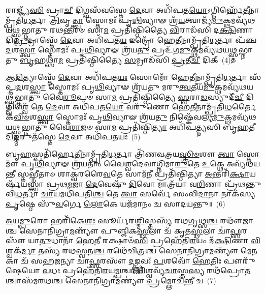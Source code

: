 𑌰𑌾𑌜𑍍𑌞𑍍𑌯᳴\-\ul{𑌸𑌿} 𑌪𑍍𑌰𑌾\-\ul{𑌚𑍀} 𑌦𑌿𑌗𑍍𑌵𑌸᳴𑌵𑌸𑍍𑌤𑍇 \ul{𑌦𑍇}\-𑌵𑌾 𑌅𑌧𑌿᳴𑌪𑌤\-\ul{𑌯𑍋}\-\-𑌽𑌗𑍍𑌨𑌿𑌰𑍍\mbox{}𑌹𑍇᳴\-\ul{𑌤𑍀}\-𑌨𑌾𑌮𑍍𑌪𑍍𑌰᳴𑌤𑌿\-\ul{𑌧}\-𑌰𑍍𑌤𑌾 \ul{𑌤𑍍𑌰𑌿}\-𑌵𑍃\-\ul{𑌤𑍍𑌤𑍍𑌵𑌾} 𑌸𑍍𑌤𑍋𑌮𑌃᳴ 𑌪𑍃\-\ul{𑌥𑌿}\-𑌵𑍍𑌯𑌾𑍟 𑌶𑍍𑌰᳴\-\ul{𑌯}\-𑌤𑍍𑌵𑌾𑌜𑍍𑌯᳴\-\ul{𑌮𑍁}\-𑌕𑍍𑌥\-𑌮𑌵𑍍𑌯᳴𑌥𑌯𑌥𑍍𑌸𑍍𑌤𑌭𑍍𑌨𑌾𑌤𑍁 𑌰𑌥\-\ul{𑌨𑍍𑌤}\-𑌰𑍞 𑌸𑌾\-\ul{𑌮} 𑌪𑍍𑌰𑌤𑌿᳴𑌷𑍍𑌠𑌿𑌤𑍍𑌯𑍈 \ul{𑌵𑌿}\-𑌰𑌾𑌡᳴𑌸𑌿 𑌦\-\ul{𑌕𑍍𑌷𑌿}\-𑌣𑌾 𑌦𑌿\-\ul{𑌗𑍍𑌰𑍁}\-𑌦𑍍𑌰𑌾𑌸𑍍𑌤𑍇᳴ \ul{𑌦𑍇}\-𑌵𑌾 𑌅𑌧𑌿᳴𑌪𑌤\-\ul{𑌯} 𑌇𑌨𑍍𑌦𑍍𑌰𑍋᳴ 𑌹𑍇\-\ul{𑌤𑍀}\-𑌨𑌾𑌮𑍍𑌪𑍍𑌰᳴𑌤𑌿\-\ul{𑌧}\-𑌰𑍍𑌤𑌾 𑌪᳴𑌞𑍍𑌚\-\ul{𑌦}\-𑌶\-\ul{𑌸𑍍𑌤𑍍𑌵𑌾} 𑌸𑍍𑌤𑍋𑌮𑌃᳴ 𑌪𑍃\-\ul{𑌥𑌿}\-𑌵𑍍𑌯𑌾𑍟 𑌶𑍍𑌰᳴𑌯\-\ul{𑌤𑍁} 𑌪𑍍𑌰𑌉᳴𑌗\-\ul{𑌮𑍁}\-𑌕𑍍𑌥𑌮𑌵𑍍𑌯᳴𑌥𑌯𑌥𑍍𑌸𑍍𑌤𑌭𑍍𑌨𑌾𑌤𑍁 \ul{𑌬𑍃}\-𑌹𑌥𑍍𑌸𑌾\-\ul{𑌮} 𑌪𑍍𑌰𑌤𑌿᳴𑌷𑍍𑌠𑌿𑌤𑍍𑌯𑍈 \ul{𑌸}\-𑌮𑍍𑌰𑌾𑌡᳴𑌸𑌿 \ul{𑌪𑍍𑌰}\-𑌤𑍀\-\ul{𑌚𑍀} 𑌦𑌿𑌕𑍍~(4)

\-\ul{𑌆}\-\-\ul{𑌦𑌿}\-𑌤𑍍𑌯𑌾𑌸𑍍𑌤𑍇᳴ \ul{𑌦𑍇}\-𑌵𑌾 𑌅𑌧𑌿᳴𑌪𑌤\-\ul{𑌯𑌃} 𑌸𑍋𑌮𑍋᳴ 𑌹𑍇\-\ul{𑌤𑍀}\-𑌨𑌾𑌮𑍍𑌪𑍍𑌰᳴𑌤𑌿\-\ul{𑌧}\-𑌰𑍍𑌤𑌾 𑌸᳴𑌪𑍍𑌤\-\ul{𑌦}\-𑌶\-\ul{𑌸𑍍𑌤𑍍𑌵𑌾} 𑌸𑍍𑌤𑍋𑌮𑌃᳴ 𑌪𑍃\-\ul{𑌥𑌿}\-𑌵𑍍𑌯𑌾𑍟 𑌶𑍍𑌰᳴𑌯𑌤𑍁 𑌮𑌰𑍁\-\ul{𑌤𑍍𑌵}\-𑌤𑍀𑌯᳴\-\ul{𑌮𑍁}\-𑌕𑍍𑌥\-𑌮𑌵𑍍𑌯᳴𑌥𑌯𑌥𑍍𑌸𑍍𑌤𑌭𑍍𑌨𑌾𑌤𑍁 𑌵𑍈\-\ul{𑌰𑍂}\-𑌪𑍞 𑌸𑌾\-\ul{𑌮} 𑌪𑍍𑌰𑌤𑌿᳴𑌷𑍍𑌠𑌿𑌤𑍍𑌯𑍈 \ul{𑌸𑍍𑌵}\-𑌰𑌾\-\ul{𑌡}\-𑌸𑍍𑌯𑍁𑌦𑍀᳴\-\ul{𑌚𑍀} 𑌦𑌿𑌗𑍍𑌵𑌿𑌶𑍍𑌵𑍇᳴ 𑌤𑍇 \ul{𑌦𑍇}\-𑌵𑌾 𑌅𑌧𑌿᳴𑌪𑌤\-\ul{𑌯𑍋} 𑌵𑌰𑍁᳴𑌣𑍋 𑌹𑍇\-\ul{𑌤𑍀}\-𑌨𑌾𑌮𑍍𑌪𑍍𑌰᳴𑌤𑌿\-\ul{𑌧}\-𑌰𑍍𑌤𑍈𑌕᳴\-\-\ul{𑌵𑌿}\-\-\ul{𑍞}\-𑌶\-\ul{𑌸𑍍𑌤𑍍𑌵𑌾} 𑌸𑍍𑌤𑍋𑌮𑌃᳴ 𑌪𑍃\-\ul{𑌥𑌿}\-𑌵𑍍𑌯𑌾𑍟 𑌶𑍍𑌰᳴𑌯\-\ul{𑌤𑍁} 𑌨𑌿𑌷𑍍𑌕𑍇᳴𑌵𑌲𑍍𑌯\-\ul{𑌮𑍁}\-𑌕𑍍𑌥𑌮𑌵𑍍𑌯᳴𑌥𑌯𑌥𑍍𑌸𑍍𑌤𑌭𑍍𑌨𑌾𑌤𑍁 𑌵𑍈\-\ul{𑌰𑌾}\-𑌜𑍞 𑌸𑌾\-\ul{𑌮} 𑌪𑍍𑌰𑌤𑌿᳴𑌷𑍍𑌠𑌿\-\ul{𑌤𑍍𑌯𑌾} 𑌅𑌧𑌿᳴𑌪𑌤𑍍𑌨𑍍𑌯𑌸𑌿 𑌬𑍃\-\ul{𑌹}\-𑌤𑍀 𑌦𑌿\-\ul{𑌙𑍍𑌮}\-𑌰𑍁𑌤᳴𑌸𑍍𑌤𑍇 \ul{𑌦𑍇}\-𑌵𑌾 𑌅𑌧𑌿᳴𑌪𑌤𑌯𑌃~(5)

𑌬𑍃\-\ul{𑌹}\-𑌸𑍍𑌪𑌤𑌿᳴𑌰𑍍\mbox{}𑌹𑍇\-\ul{𑌤𑍀}\-𑌨𑌾𑌮𑍍𑌪𑍍𑌰᳴𑌤𑌿\-\ul{𑌧}\-𑌰𑍍𑌤𑌾 𑌤𑍍𑌰𑌿᳴𑌣𑌵𑌤𑍍𑌰𑌯\-\ul{𑌸𑍍𑌤𑍍𑌰𑌿}\-\-\ul{𑍞}\-𑌶𑍗 \ul{𑌤𑍍𑌵𑌾} 𑌸𑍍𑌤𑍋𑌮𑍗᳴ 𑌪𑍃\-\ul{𑌥𑌿}\-𑌵𑍍𑌯𑌾𑍟 𑌶𑍍𑌰᳴𑌯𑌤𑌾𑌂 𑌵𑍈𑌶𑍍𑌵𑌦𑍇𑌵𑌾𑌗𑍍𑌨𑌿𑌮𑌾\-\ul{𑌰𑍁}\-𑌤𑍇 \ul{𑌉}\-𑌕𑍍𑌥𑍇 𑌅𑌵𑍍𑌯᳴𑌥𑌯𑌨𑍍𑌤𑍀 𑌸𑍍𑌤𑌭𑍍𑌨𑍀𑌤𑌾𑍞 𑌶𑌾𑌕𑍍𑌵𑌰𑌰𑍈\-\ul{𑌵}\-𑌤𑍇 𑌸𑌾𑌮᳴\-\ul{𑌨𑍀} 𑌪𑍍𑌰𑌤𑌿᳴𑌷𑍍𑌠𑌿𑌤𑍍𑌯𑌾 \ul{𑌅}\-𑌨𑍍𑌤𑌰𑌿᳴\-\ul{𑌕𑍍𑌷𑌾}\-𑌯𑌰𑍍\mbox{}𑌷᳴𑌯𑌸𑍍𑌤𑍍𑌵𑌾 𑌪𑍍𑌰𑌥\-\ul{𑌮}\-𑌜𑌾 \ul{𑌦𑍇}\-𑌵𑍇𑌷𑍁᳴ \ul{𑌦𑌿}\-𑌵𑍋 𑌮𑌾𑌤𑍍𑌰᳴𑌯𑌾 𑌵\-\ul{𑌰𑌿}\-𑌣𑌾 𑌪𑍍𑌰᳴𑌥𑌨𑍍𑌤𑍁 𑌵𑌿\-\ul{𑌧}\-𑌰𑍍𑌤𑌾 \ul{𑌚𑌾}\-𑌯𑌮𑌧𑌿᳴𑌪𑌤𑌿\-\ul{𑌶𑍍𑌚} 𑌤𑍇 \ul{𑌤𑍍𑌵𑌾} 𑌸𑌰𑍍𑌵𑍇᳴ 𑌸𑌂𑌵𑌿\-\ul{𑌦𑌾}\-𑌨𑌾 𑌨𑌾𑌕᳴𑌸𑍍𑌯 \ul{𑌪𑍃}\-𑌷𑍍𑌠𑍇 𑌸𑍁᳴\-\ul{𑌵}\-𑌰𑍍𑌗𑍇 \ul{𑌲𑍋}\-𑌕𑍇 𑌯𑌜᳴𑌮𑌾𑌨𑌂 𑌚 𑌸𑌾𑌦𑌯𑌨𑍍𑌤𑍁॥~(6)

{\anuvakamend[{\-\ul{𑌪𑍍𑌰}\-𑌤𑍀\-\ul{𑌚𑍀} 𑌦𑌿\-\ul{𑌙𑍍𑌮}\-𑌰𑍁𑌤᳴𑌸𑍍𑌤𑍇 \ul{𑌦𑍇}\-𑌵𑌾 𑌅𑌧𑌿᳴𑌪𑌤𑌯𑌶𑍍𑌚𑌤𑍍𑌵𑌾\-\ul{𑌰𑌿}\-\-\ul{𑍞}\-𑌶𑌚𑍍𑌚᳴}]}%

\-\ul{𑌅}\-𑌯\-\ul{𑌮𑍍𑌪𑍁}\-𑌰𑍋 𑌹𑌰𑌿᳴𑌕𑍇\-\ul{𑌶𑌃} 𑌸𑍂𑌰𑍍𑌯᳴𑌰\-\ul{𑌶𑍍𑌮𑌿}\-𑌸𑍍𑌤𑌸𑍍𑌯᳴ 𑌰𑌥\-\ul{𑌗𑍃}\-𑌥𑍍𑌸\-\ul{𑌶𑍍𑌚} 𑌰𑌥𑍗᳴𑌜𑌾𑌶𑍍𑌚 𑌸𑍇𑌨𑌾𑌨𑌿𑌗𑍍𑌰𑌾\-\ul{𑌮}\-𑌣𑍍𑌯𑍗᳴ 𑌪𑍁𑌞𑍍𑌜𑌿𑌕\-\ul{𑌸𑍍𑌥}\-𑌲𑌾 𑌚᳴ 𑌕𑍃𑌤\-\ul{𑌸𑍍𑌥}\-𑌲𑌾 𑌚𑌾॑\-\ul{𑌫𑍍𑌸}\-𑌰𑌸𑍗᳴ 𑌯𑌾\-\ul{𑌤𑍁}\-𑌧𑌾𑌨𑌾᳴ \ul{𑌹𑍇}\-𑌤𑍀 𑌰𑌕𑍍𑌷𑌾𑍞᳴\-\ul{𑌸𑌿} 𑌪𑍍𑌰𑌹𑍇᳴𑌤𑌿\-\ul{𑌰}\-𑌯𑌂 𑌦᳴\-\ul{𑌕𑍍𑌷𑌿}\-𑌣𑌾 \ul{𑌵𑌿}\-𑌶𑍍𑌵𑌕᳴\-\ul{𑌰𑍍𑌮𑌾} 𑌤𑌸𑍍𑌯᳴ 𑌰𑌥\-\ul{𑌸𑍍𑌵}\-𑌨\-\ul{𑌶𑍍𑌚} 𑌰𑌥𑍇᳴𑌚𑌿𑌤𑍍𑌰𑌶𑍍𑌚 𑌸𑍇𑌨𑌾𑌨𑌿𑌗𑍍𑌰𑌾\-\ul{𑌮}\-𑌣𑍍𑌯𑍗᳴ 𑌮𑍇\-\ul{𑌨}\-𑌕𑌾 𑌚᳴ 𑌸𑌹\-\ul{𑌜}\-𑌨𑍍𑌯𑌾 𑌚𑌾॑\-\ul{𑌫𑍍𑌸}\-𑌰𑌸𑍗᳴ \ul{𑌦}\-𑌙𑍍𑌕𑍍𑌷𑍍𑌣𑌵𑌃᳴ \ul{𑌪}\-𑌶𑌵𑍋᳴ \ul{𑌹𑍇}\-𑌤𑌿𑌃 𑌪𑍗𑌰𑍁᳴𑌷𑍇𑌯𑍋 \ul{𑌵}\-𑌧𑌃 𑌪𑍍𑌰𑌹𑍇᳴𑌤𑌿\-\ul{𑌰}\-𑌯\-\ul{𑌮𑍍𑌪}\-𑌶𑍍𑌚𑌾\-\ul{𑌦𑍍𑌵𑌿}\-𑌶𑍍𑌵𑌵𑍍𑌯᳴\-\ul{𑌚𑌾}\-𑌸𑍍𑌤\-\ul{𑌸𑍍𑌯} 𑌰𑌥᳴𑌪𑍍𑌰𑍋\-\ul{𑌤}\-𑌶𑍍𑌚𑌾𑌸᳴𑌮𑌰𑌥𑌶𑍍𑌚 𑌸𑍇𑌨𑌾𑌨𑌿𑌗𑍍𑌰𑌾\-\ul{𑌮}\-𑌣𑍍𑌯𑍗॑ \ul{𑌪𑍍𑌰}\-𑌮𑍍𑌲𑍋𑌚᳴𑌨𑍍𑌤𑍀 𑌚~(7)

